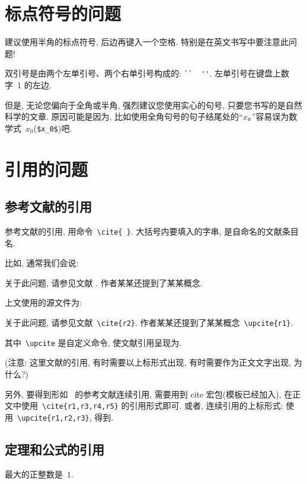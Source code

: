 \documentclass{NJUPTThesis}%
\begin{document}
\section{标点符号的问题}

建议使用半角的标点符号, 后边再键入一个空格. 特别是在英文书写中要注意此问题!

双引号是由两个左单引号、两个右单引号构成的: \verb|``  ''|. 左单引号在键盘上数字~1 的左边.

但是, 无论您偏向于全角或半角, 强烈建议您使用实心的句号, 只要您书写的是自然科学的文章.
原因可能是因为, 比如使用全角句号的句子结尾处的``$x$。''容易误为数学式~$x_0$(\verb|$x_0$|)吧.



\section{引用的问题}


\subsection{参考文献的引用}

参考文献的引用, 用命令~\verb|\cite{ }|. 大括号内要填入的字串, 是自命名的文献条目名.

比如, 通常我们会说:

 {\kaishu
关于此问题, 请参见文献 \cite{r2}. 作者某某还提到了某某概念.}


上文使用的源文件为:

 {\kaishu
关于此问题, 请参见文献~\verb|\cite{r2}|. 作者某某还提到了某某概念~\verb|\upcite{r1}|.
}

其中~\verb|\upcite| 是自定义命令, 使文献引用呈现为.

({\heiti 注意:} {\kaishu 这里文献的引用, 有时需要以上标形式出现, 有时需要作为正文文字出现, 为什么?})

另外, 要得到形如~\cite{r1,r3,r4,r5} 的参考文献连续引用, 需要用到 cite 宏包(模板已经加入),
在正文中使用~\verb|\cite{r1,r3,r4,r5}| 的引用形式即可.
或者, 连续引用的上标形式: 使用~\verb|\upcite{r1,r2,r3}|, 得到.

\subsection{定理和公式的引用}

\begin{theorem}[谁发现的]\label{th-abcd}
最大的正整数是~$1$.
\end{theorem}
\end{document}
